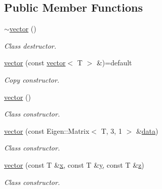 \subsection*{Public Member Functions}
\begin{DoxyCompactItemize}
\item 
\mbox{\label{classddd_1_1vector_aa318607b6bdd556e5aa371488b3b2da8}} 
\hyperlink{classddd_1_1vector_aa318607b6bdd556e5aa371488b3b2da8}{$\sim$vector} ()
\begin{DoxyCompactList}\small\item\em Class destructor. \end{DoxyCompactList}\item 
\mbox{\label{classddd_1_1vector_a9e10641f3e361c24f5a9756bbd1b2d44}} 
\hyperlink{classddd_1_1vector_a9e10641f3e361c24f5a9756bbd1b2d44}{vector} (const \hyperlink{classddd_1_1vector}{vector}$<$ T $>$ \&)=default
\begin{DoxyCompactList}\small\item\em Copy constructor. \end{DoxyCompactList}\item 
\mbox{\label{classddd_1_1vector_a5231808b18bae0590e5083ff27b29056}} 
\hyperlink{classddd_1_1vector_a5231808b18bae0590e5083ff27b29056}{vector} ()
\begin{DoxyCompactList}\small\item\em Class constructor. \end{DoxyCompactList}\item 
\hyperlink{classddd_1_1vector_a5dec8f05a011372b6b2795827607e6b2}{vector} (const Eigen\+::\+Matrix$<$ T, 3, 1 $>$ \&\hyperlink{classddd_1_1row_object_a30e3d89f19ec4001c9e70d0faaa6c579}{data})
\begin{DoxyCompactList}\small\item\em Class constructor. \end{DoxyCompactList}\item 
\hyperlink{classddd_1_1vector_a90f097b576d026cb86b487546b841622}{vector} (const T \&\hyperlink{classddd_1_1row_object_a29439db5bbde399481c341cb66b7973e}{x}, const T \&\hyperlink{classddd_1_1row_object_adac0d72ea44ad43b82f47b7a26010e4e}{y}, const T \&\hyperlink{classddd_1_1row_object_a8d1d3c3217a0ac951f90e39d980faef4}{z})
\begin{DoxyCompactList}\small\item\em Class constructor. \end{DoxyCompactList}\item 

\end{DoxyCompactItemize}
